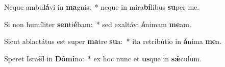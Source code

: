 \item Neque ambu\textbf{lá}vi in \textbf{ma}gnis:~* neque in mira\textbf{bí}libus \textbf{su}per me.
\item Si non humíliter \textbf{sen}ti\textbf{é}bam:~* sed exaltávi \textbf{á}nimam \textbf{me}am.
\item Sicut ablactátus est super \textbf{ma}tre \textbf{su}a:~* ita retribútio in \textbf{á}nima \textbf{me}a.
\item Speret Isra\textbf{ël} in \textbf{Dó}\textbf{mi}no:~* ex hoc nunc et \textbf{us}que in \textbf{sǽ}culum.
